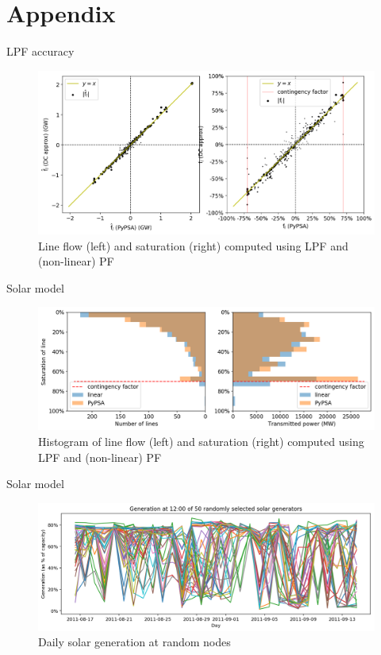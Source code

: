 \documentclass[10pt]{beamer}
\begin{document}
\appendix

\section{Appendix}

\begin{frame}{LPF accuracy}
    \begin{figure}
        \centering
        \includegraphics[width=\textwidth]{img/lineflowcorr.png}
        \caption{Line flow (left) and saturation (right) computed using LPF and (non-linear) PF}
    \end{figure}
\end{frame}
\begin{frame}{Solar model}
    \begin{figure}
        \centering
        \includegraphics[width=\textwidth]{img/saturationhistrot.png}
        \caption{Histogram of line flow (left) and saturation (right) computed using LPF and (non-linear) PF}
    \end{figure}
\end{frame}

\begin{frame}{Solar model}
    \begin{figure}
        \centering
        \includegraphics[width=\textwidth]{img/genprofilerandom.png}
        \caption{Daily solar generation at random nodes}
        \label{fig:genprofilerandom}
    \end{figure}
\end{frame}
\end{document}
